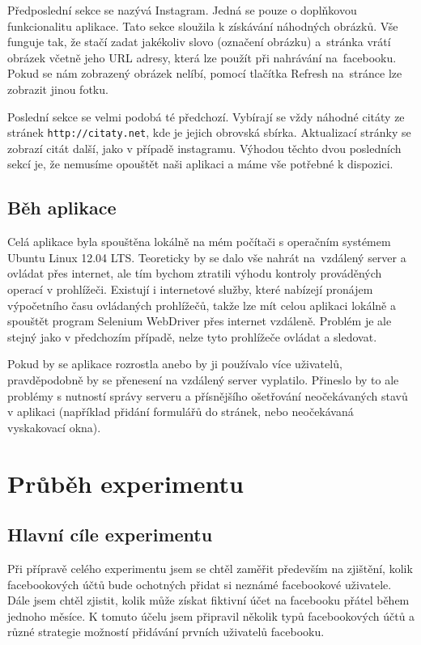 \documentclass[thesis=M,czech]{FITthesis}[2013/05/10]
\begin{document}
Předposlední sekce se nazývá Instagram. Jedná se pouze o doplňkovou funkcionalitu aplikace. Tato sekce sloužila k získávání náhodných obrázků. Vše funguje tak, že stačí zadat jakékoliv slovo (označení obrázku) a~stránka vrátí obrázek včetně jeho URL adresy, která lze použít při nahrávání na~facebooku. Pokud se nám zobrazený obrázek nelíbí, pomocí tlačítka Refresh na~stránce lze zobrazit jinou fotku.

Poslední sekce se velmi podobá té předchozí. Vybírají se vždy náhodné citáty ze stránek \verb|http://citaty.net|, kde je jejich obrovská sbírka. Aktualizací stránky se zobrazí citát další, jako v případě instagramu. Výhodou těchto dvou posledních sekcí je, že nemusíme opouštět naši aplikaci a máme vše potřebné k dispozici.



\section{Běh aplikace}

Celá aplikace byla spouštěna lokálně na mém počítači s operačním systémem Ubuntu Linux 12.04 LTS. Teoreticky by se dalo vše nahrát na~vzdálený server a ovládat přes internet, ale tím bychom ztratili výhodu kontroly prováděných operací v prohlížeči. Existují i internetové služby, které nabízejí pronájem výpočetního času ovládaných prohlížečů, takže lze mít celou aplikaci lokálně a spouštět program Selenium WebDriver přes internet vzdáleně. Problém je ale stejný jako v předchozím případě, nelze tyto prohlížeče ovládat a sledovat.

Pokud by se aplikace rozrostla anebo by ji používalo více uživatelů, pravděpodobně by se přenesení na vzdálený server vyplatilo. Přineslo by to ale problémy s nutností správy serveru a přísnějšího ošetřování neočekávaných stavů v aplikaci (například přidání formulářů do stránek, nebo neočekávaná vyskakovací okna).





\chapter{Průběh experimentu}

\section{Hlavní cíle experimentu}

Při přípravě celého experimentu jsem se chtěl zaměřit především na zjištění, kolik facebookových účtů bude ochotných přidat si neznámé facebookové uživatele. Dále jsem chtěl zjistit, kolik může získat fiktivní účet na facebooku přátel během jednoho měsíce. K tomuto účelu jsem připravil několik typů facebookových účtů a různé strategie možností přidávání prvních uživatelů facebooku.
\end{document}
